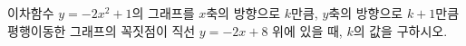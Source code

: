 이차함수 $y=-2x^2+1$의 그래프를 $x$축의 방향으로 $k$만큼, $y$축의 방향으로 $k+1$만큼 평행이동한 그래프의 꼭짓점이 직선 $y=-2x+8$ 위에 있을 때, $k$의 값을 구하시오.
